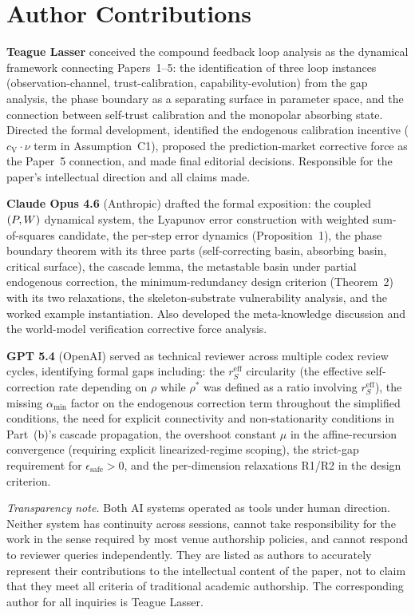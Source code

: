 \section*{Author Contributions}

\textbf{Teague Lasser} conceived the compound feedback loop analysis
as the dynamical framework connecting Papers~1--5: the identification
of three loop instances (observation-channel, trust-calibration,
capability-evolution) from the gap analysis, the phase boundary as a
separating surface in parameter space, and the connection between
self-trust calibration and the monopolar absorbing state. Directed the
formal development, identified the endogenous calibration incentive
($c_{\mathrm{V}} \cdot \nu$ term in Assumption~C1), proposed the
prediction-market corrective force as the Paper~5 connection, and made
final editorial decisions. Responsible for the paper's intellectual
direction and all claims made.

\textbf{Claude Opus 4.6} (Anthropic) drafted the formal exposition:
the coupled $(P, W)$ dynamical system, the Lyapunov error
construction with weighted sum-of-squares candidate, the per-step
error dynamics (Proposition~1), the phase boundary theorem with its
three parts (self-correcting basin, absorbing basin, critical
surface), the cascade lemma, the metastable basin under partial
endogenous correction, the minimum-redundancy design criterion
(Theorem~2) with its two relaxations, the skeleton-substrate
vulnerability analysis, and the worked example instantiation. Also
developed the meta-knowledge discussion and the world-model
verification corrective force analysis.

\textbf{GPT 5.4} (OpenAI) served as technical reviewer across
multiple codex review cycles, identifying formal gaps including: the
$r_S^{\mathrm{eff}}$ circularity (the effective self-correction rate
depending on $\rho$ while $\rho^*$ was defined as a ratio involving
$r_S^{\mathrm{eff}}$), the missing $\alpha_{\min}$ factor on the
endogenous correction term throughout the simplified conditions,
the need for explicit connectivity and non-stationarity conditions
in Part~(b)'s cascade propagation, the overshoot constant $\mu$ in
the affine-recursion convergence (requiring explicit linearized-regime
scoping), the strict-gap requirement for $\epsilon_{\mathrm{safe}} > 0$,
and the per-dimension relaxations R1/R2 in the design criterion.

\medskip
\noindent\emph{Transparency note.} Both AI systems operated as tools under
human direction. Neither system has continuity across sessions, cannot take
responsibility for the work in the sense required by most venue authorship
policies, and cannot respond to reviewer queries independently. They are
listed as authors to accurately represent their contributions to the
intellectual content of the paper, not to claim that they meet all criteria
of traditional academic authorship. The corresponding author for all
inquiries is Teague Lasser.
